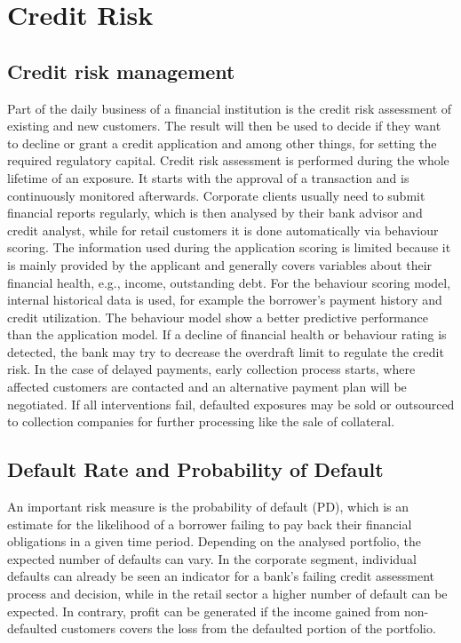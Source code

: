 \chapter{Credit Risk}

\section{Credit risk management}
Part of the daily business of a financial institution is the credit risk assessment of existing and new customers. The result will then be used to decide if they want to decline or grant a credit application and among other things, for setting the required regulatory capital. Credit risk assessment is performed during the whole lifetime of an exposure. It starts with the approval of a transaction and is continuously monitored afterwards. Corporate clients usually need to submit financial reports regularly, which is then analysed by their bank advisor and credit analyst, while for retail customers it is done automatically via behaviour scoring. The information used during the application scoring is limited because it is mainly provided by the applicant and generally covers variables about their financial health, e.g., income, outstanding debt. For the behaviour scoring model, internal historical data is used, for example the borrower's payment history and credit utilization. The behaviour model show a better predictive performance than the application model. If a decline of financial health or behaviour rating is detected, the bank may try to decrease the overdraft limit to regulate the credit risk. In the case of delayed payments, early collection process starts, where affected customers are contacted and an alternative payment plan will be negotiated. If all interventions fail, defaulted exposures may be sold or outsourced to collection companies for further processing like the sale of collateral. 

\section{Default Rate and Probability of Default}
\label{sec:dr_pd}
An important risk measure is the probability of default (PD), which is an estimate for the likelihood of a borrower failing to pay back their financial obligations in a given time period. Depending on the analysed portfolio, the expected number of defaults can vary. In the corporate segment, individual defaults can already be seen an indicator for a bank's failing credit assessment process and decision, while in the retail sector a higher number of default can be expected. In contrary, profit can be generated if the income gained from non-defaulted customers covers the loss from the defaulted portion of the portfolio.

